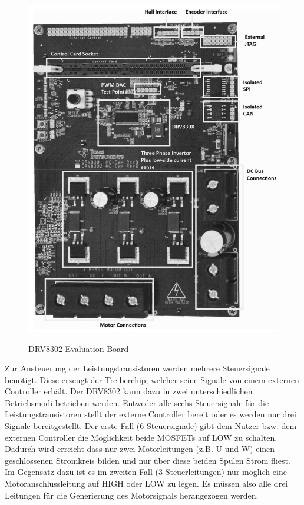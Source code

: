 \begin{figure}[htbp]
	\centering
	\includegraphics[width=\textwidth]{hardware/graphics/TI_Eval_Board}
	\caption{DRV8302 Evaluation Board}
	\quelle \cite{Instruments2014}
	\label{fig:DRV8302Board}
\end{figure}

Zur Ansteuerung der Leistungstransistoren werden mehrere Steuersignale benötigt.
Diese erzeugt der Treiberchip, welcher seine Signale von einem externen Controller erhält.
Der DRV8302 kann dazu in zwei unterschiedlichen Betriebsmodi betrieben werden.
Entweder alle sechs Steuersignale für die Leistungstransistoren stellt der externe Controller bereit oder es werden nur drei Signale bereitgestellt.
Der erste Fall (6 Steuersignale) gibt dem Nutzer bzw. dem externen Controller die Möglichkeit beide MOSFETs auf LOW zu schalten.
Dadurch wird erreicht dass nur zwei Motorleitungen (z.B. U und W) einen geschlossenen Stromkreis bilden und nur über diese beiden Spulen Strom fliest.
Im Gegensatz dazu ist es im zweiten Fall (3 Steuerleitungen) nur möglich eine Motoranschlussleitung auf HIGH oder LOW zu legen. 
Es müssen also alle drei Leitungen für die Generierung des Motorsignals herangezogen werden.

